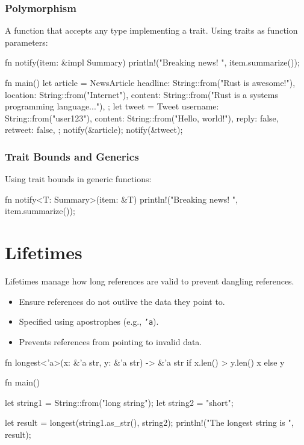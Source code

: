 \documentclass[8pt,a4paper,twocolumn]{extarticle}
\begin{document}
\subsubsection{Polymorphism}

A function that accepts any type implementing a trait.
Using traits as function parameters:

\begin{Code}
  fn notify(item: &impl Summary) {
      println!("Breaking news! {}", item.summarize());
  }

  fn main() {
      let article = NewsArticle {
          headline: String::from("Rust is awesome!"),
          location: String::from("Internet"),
          content: String::from("Rust is a systems programming language..."),
      };
      let tweet = Tweet {
          username: String::from("user123"),
          content: String::from("Hello, world!"),
          reply: false,
          retweet: false,
      };
      notify(&article);
      notify(&tweet);
  }
\end{Code}

\subsubsection{Trait Bounds and Generics}

Using trait bounds in generic functions:
\begin{Code}
  fn notify<T: Summary>(item: &T) {
      println!("Breaking news! {}", item.summarize());
  }
\end{Code}


\section{Lifetimes}


Lifetimes manage how long references are valid to prevent dangling references.

\begin{itemize}
    \item Ensure references do not outlive the data they point to.
    \item Specified using apostrophes (e.g., \texttt{'a}).
    \item Prevents references from pointing to invalid data.
\end{itemize}

\begin{Code}
    fn longest<'a>(x: &'a str, y: &'a str) -> &'a str {
        if x.len() > y.len() {
            x
        } else {
            y
        }
    }
    
    fn main() {
        let string1 = String::from("long string");
        let string2 = "short";
    
        let result = longest(string1.as_str(), string2);
        println!("The longest string is {}", result);
    }
\end{Code}
\end{document}
